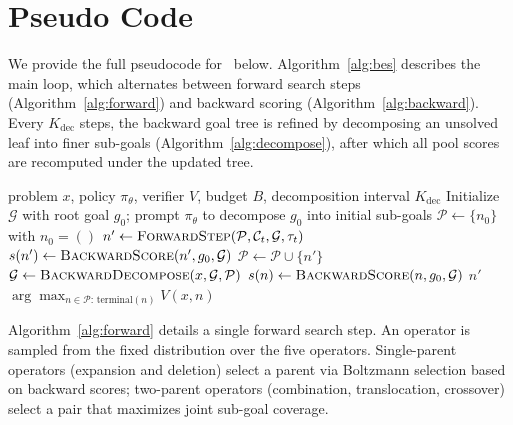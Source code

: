 \clearpage
\section{Pseudo Code}
\label{app:algo}

We provide the full pseudocode for \ours\ below. Algorithm~\ref{alg:bes} describes the main loop, which alternates between forward search steps (Algorithm~\ref{alg:forward}) and backward scoring (Algorithm~\ref{alg:backward}). Every $K_{\mathrm{dec}}$ steps, the backward goal tree is refined by decomposing an unsolved leaf into finer sub-goals (Algorithm~\ref{alg:decompose}), after which all pool scores are recomputed under the updated tree.

\begin{algorithm}[h]
\caption{\ours: Bidirectional Evolutionary Search}
\label{alg:bes}
\begin{algorithmic}[1]
\Require problem $x$, policy $\pi_\theta$, verifier $V$, budget $B$, decomposition interval $K_{\mathrm{dec}}$
\State Initialize $\mathcal{G}$ with root goal $g_0$; prompt $\pi_\theta$ to decompose $g_0$ into initial sub-goals
\State $\mathcal{P} \leftarrow \{n_0\}$ with $n_0 = ()$ 
    \State $n' \leftarrow \textsc{ForwardStep}(\mathcal{P}, \mathcal{C}_t, \mathcal{G}, \tau_t)$ 
    \State $s(n') \leftarrow \textsc{BackwardScore}(n', g_0, \mathcal{G})$ 
    \State $\mathcal{P} \leftarrow \mathcal{P} \cup \{n'\}$
        \State $\mathcal{G} \leftarrow \textsc{BackwardDecompose}(x, \mathcal{G}, \mathcal{P})$ 
         
            \State $s(n) \leftarrow \textsc{BackwardScore}(n, g_0, \mathcal{G})$
        \EndFor
    \EndIf
        \State \Return $n'$
    \EndIf
\EndFor
\State \Return $\arg\max_{n \in \mathcal{P}:\, \mathrm{terminal}(n)} V(x, n)$
\end{algorithmic}
\end{algorithm}

Algorithm~\ref{alg:forward} details a single forward search step. An operator is sampled from the fixed distribution over the five operators. Single-parent operators (expansion and deletion) select a parent via Boltzmann selection based on backward scores; two-parent operators (combination, translocation, crossover) select a pair that maximizes joint sub-goal coverage.

